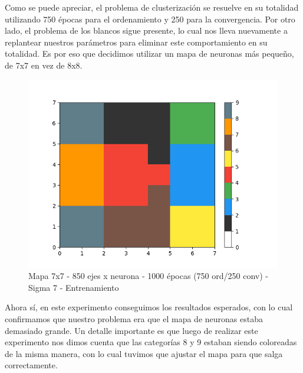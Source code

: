 Como se puede apreciar, el problema de clusterización se resuelve en su totalidad utilizando 750 épocas para el ordenamiento y 250 para la convergencia. Por otro lado, el problema de los blancos sigue presente, lo cual nos lleva nuevamente a replantear nuestros parámetros para eliminar este comportamiento en su totalidad. Es por eso que decidimos utilizar un mapa de neuronas más pequeño, de 7x7 en vez de 8x8. 

\begin{figure}[h]
  \begin{center}
    \includegraphics[scale=0.4]{../img/map7x7_1000ep_850en_sigma7_faseord750.png}
  \caption{Mapa 7x7 - 850 ejes x neurona - 1000 épocas (750 ord/250 conv) - Sigma 7 - Entrenamiento}
  \end{center}
\end{figure}

Ahora sí, en este experimento conseguimos los resultados esperados, con lo cual confirmamos que nuestro problema era que el mapa de neuronas estaba demasiado grande. Un detalle importante es que luego de realizar este experimento nos dimos cuenta que las categorías 8 y 9 estaban siendo coloreadas de la misma manera, con lo cual tuvimos que ajustar el mapa para que salga correctamente.

